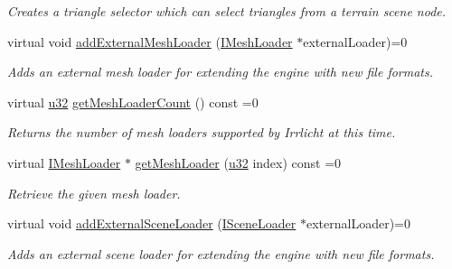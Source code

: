 \begin{DoxyCompactItemize}
\begin{DoxyCompactList}\small\item\em Creates a triangle selector which can select triangles from a terrain scene node. \end{DoxyCompactList}\item 
virtual void \hyperlink{classirr_1_1scene_1_1ISceneManager_a808972cc001db86c0576c38b3b3fbbf7}{add\+External\+Mesh\+Loader} (\hyperlink{classirr_1_1scene_1_1IMeshLoader}{I\+Mesh\+Loader} $\ast$external\+Loader)=0
\begin{DoxyCompactList}\small\item\em Adds an external mesh loader for extending the engine with new file formats. \end{DoxyCompactList}\item 
\mbox{\label{classirr_1_1scene_1_1ISceneManager_abb3fc9803b7de0cf7177042bd24508ad}} 
virtual \hyperlink{namespaceirr_a0416a53257075833e7002efd0a18e804}{u32} \hyperlink{classirr_1_1scene_1_1ISceneManager_abb3fc9803b7de0cf7177042bd24508ad}{get\+Mesh\+Loader\+Count} () const =0
\begin{DoxyCompactList}\small\item\em Returns the number of mesh loaders supported by Irrlicht at this time. \end{DoxyCompactList}\item 
virtual \hyperlink{classirr_1_1scene_1_1IMeshLoader}{I\+Mesh\+Loader} $\ast$ \hyperlink{classirr_1_1scene_1_1ISceneManager_afabf244b50875a52eb42d5d375fa40d4}{get\+Mesh\+Loader} (\hyperlink{namespaceirr_a0416a53257075833e7002efd0a18e804}{u32} index) const =0
\begin{DoxyCompactList}\small\item\em Retrieve the given mesh loader. \end{DoxyCompactList}\item 
virtual void \hyperlink{classirr_1_1scene_1_1ISceneManager_a8f0bc0221c4faaca80ac8f560ee424ef}{add\+External\+Scene\+Loader} (\hyperlink{classirr_1_1scene_1_1ISceneLoader}{I\+Scene\+Loader} $\ast$external\+Loader)=0
\begin{DoxyCompactList}\small\item\em Adds an external scene loader for extending the engine with new file formats. \end{DoxyCompactList}\item 
\mbox{\label{classirr_1_1scene_1_1ISceneManager_a3e5cd3e93d3ed711df7692c830c5a58a}} 

\end{DoxyCompactItemize}
